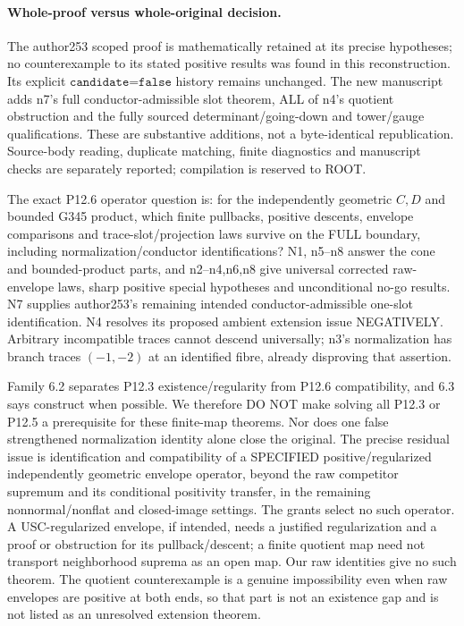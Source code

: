 \paragraph{Whole-proof versus whole-original decision.}
The author253 scoped proof is mathematically retained at its precise hypotheses; no counterexample to its stated positive results was found in this reconstruction. Its explicit $\texttt{candidate=false}$ history remains unchanged. The new manuscript adds n7's full conductor-admissible slot theorem, ALL of n4's quotient obstruction and the fully sourced determinant/going-down and tower/gauge qualifications. These are substantive additions, not a byte-identical republication. Source-body reading, duplicate matching, finite diagnostics and manuscript checks are separately reported; compilation is reserved to ROOT.

The exact P12.6 operator question is: for the independently geometric $C,D$ and bounded G345 product, which finite pullbacks, positive descents, envelope comparisons and trace-slot/projection laws survive on the FULL boundary, including normalization/conductor identifications? N1, n5--n8 answer the cone and bounded-product parts, and n2--n4,n6,n8 give universal corrected raw-envelope laws, sharp positive special hypotheses and unconditional no-go results. N7 supplies author253's remaining intended conductor-admissible one-slot identification. N4 resolves its proposed ambient extension issue NEGATIVELY. Arbitrary incompatible traces cannot descend universally; n3's normalization has branch traces $(-1,-2)$ at an identified fibre, already disproving that assertion.

Family 6.2 separates P12.3 existence/regularity from P12.6 compatibility, and 6.3 says construct when possible. We therefore DO NOT make solving all P12.3 or P12.5 a prerequisite for these finite-map theorems. Nor does one false strengthened normalization identity alone close the original. The precise residual issue is identification and compatibility of a SPECIFIED positive/regularized independently geometric envelope operator, beyond the raw competitor supremum and its conditional positivity transfer, in the remaining nonnormal/nonflat and closed-image settings. The grants select no such operator. A USC-regularized envelope, if intended, needs a justified regularization and a proof or obstruction for its pullback/descent; a finite quotient map need not transport neighborhood suprema as an open map. Our raw identities give no such theorem. The quotient counterexample is a genuine impossibility even when raw envelopes are positive at both ends, so that part is not an existence gap and is not listed as an unresolved extension theorem.

